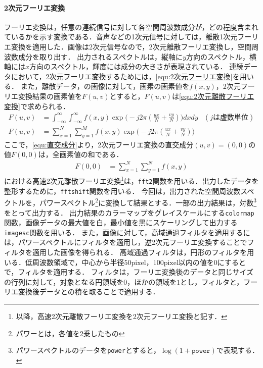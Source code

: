 \paragraph{2次元フーリエ変換}
フーリエ変換は，任意の連続信号に対して各空間周波数成分が，どの程度含まれているかを示す変換である．音声などの1次元信号に対しては，離散1次元フーリエ変換を適用した．画像は2次元信号なので，2次元離散フーリエ変換し，空間周波数成分を取り出す．
出力されるスペクトルは，縦軸に\(y\)方向のスペクトル，横軸には\(x\)方向のスペクトル，輝度には成分の大きさが表現されている．
連続データにおいて，2次元フーリエ変換するためには，\eqref{equ:2次元フーリエ変換}を用いる．
また，離散データ，の画像に対して，画素の画素値を\(f(x,y)\)，2次元フーリエ変換結果の画素値を\(F(u,v)\)とすると，\(F(u,v)\)は\eqref{equ:2次元離散フーリエ変換}で求められる．
\begin{align}
    F(u,v) & =\int_{-\infty}^{\infty}\int_{-\infty}^{\infty}f(x,y)\exp\Big(-j2\pi\left(\frac{ux}{N}+\frac{vy}{N}\right)\Big)dxdy  & (j\textrm{は虚数単位})\label{equ:2次元フーリエ変換} \\
    F(u,v) & =\sum_{x=1}^{N}\sum_{y=1}^{M}f(x,y)\exp\Big(-j2\pi\left(\frac{ux}{N}+\frac{vy}{N}\right)\Big)\label{equ:2次元離散フーリエ変換}
\end{align}
ここで，\eqref{equ:直交成分}より，2次元フーリエ変換の直交成分\((u,v)=(0,0)\)の値\(F(0,0)\)は，全画素値の和である．
\begin{align}
    F(0,0) & = \sum_{x=1}^{N}\sum_{y=1}^{N}f(x,y)\label{equ:直交成分}
\end{align}
\matlab における高速2次元離散フーリエ変換\footnote{以降，高速2次元離散フーリエ変換を2次元フーリエ変換と記す．}は，\texttt{fft2}関数を用いる．出力したデータを整形するために，\texttt{fftshift}関数を用いる．
今回は，出力された空間周波数スペクトルを，パワースペクトル\footnote{パワーとは，各値を2乗したもの}に変換して結果とする．一部の出力結果は，対数\footnote{パワースペクトルのデータを\texttt{power}とすると，\(\log(1+\texttt{power})\)で表現する．}をとって出力する．
出力結果のカラーマップをグレイスケールにする\texttt{colormap}関数，画像データの最大値を白，最小値を黒にスケーリングして出力する\texttt{imagesc}関数を用いる．
また，画像に対して，高域通過フィルタを適用するには，パワースペクトルにフィルタを適用し，逆2次元フーリエ変換することでフィルタを適用した画像を得られる．
高域通過フィルタは，円形のフィルタを用いる．低周波数領域で，中心から半径\(50\textrm{pixel}\)，\(100\textrm{pixel}\)以内の値を\(0\)にするとで，フィルタを適用する．
フィルタは，フーリエ変換後のデータと同じサイズの行列に対して，対象となる円領域を\(0\)，ほかの領域を\(1\)とし，フィルタと，フーリエ変換後データとの積を取ることで適用する．
